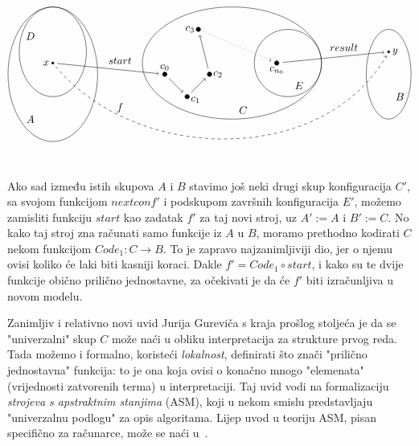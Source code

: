 \begin{equation}\label{dia:alg}
\begin{tikzpicture}[scale=0.75,baseline=(c0)]
\draw (0,0) ellipse (2 and 3);
\draw (8,0.5) ellipse (4 and 2.5);
\draw (15,0) ellipse (1 and 2);
\draw (0,1) ellipse (1.5 and 2);
\draw (10.5,0.5) circle (1.5);
\draw[fill] (0,0.5) coordinate (x) circle (0.05) node[left]{$x$};
\node at(-1,1.7) {$D$};
\node at(-1,-2) {$A$};
\node at(8.5,-1.6) {$C$};
\node at(11,-0.5) {$E$};
\node at(15.5,-1) {$B$};
\node at(3,0.6) {$start$};
\node at(13,1.2) {$result$};
\node at(3,-1.5) {$f$};
\draw[fill] (5,0) coordinate (c0) circle (0.1) node[above]{$c_0$};
\draw[fill] (6,-1) coordinate (c1) circle (0.1) node[right,yshift=-3]{$c_1$};
\draw[fill] (7,0) coordinate (c2) circle (0.1) node[right]{$c_2$};
\draw[fill] (6.5,2) coordinate (c3) circle (0.1) node[left]{$c_3$};
\draw[fill] (10,0.5) coordinate (cn0) circle (0.1) node[below]{$c_{n_0}$};
\draw[fill] (15,1) coordinate (y) circle (0.05) node[right]{$y$};
\draw[shorten <=1.5mm,shorten >=2mm,->] (x) -- (c0);
\draw[shorten <=2mm,shorten >=2mm,->] (c0) -- (c1);
\draw[shorten <=2mm,shorten >=2mm,->] (c1) -- (c2);
\draw[shorten <=2mm,shorten >=2mm,->] (c2) -- (c3);
\draw[dotted,shorten <=2mm,shorten >=2mm,->] (c3) -- (cn0);
\draw[shorten <=2mm,shorten >=1.5mm,->] (cn0) -- (y);
\draw[shorten <=1.5mm, shorten >=1.5mm,dashed,->] (x) to[in=240,out=-50] (y);
\end{tikzpicture}    
\end{equation}


Ako sad između istih skupova $A$ i $B$ stavimo još neki drugi skup konfiguracija $C'$, sa svojom funkcijom $nextconf'$ i podskupom završnih konfiguracija $E'$, možemo zamisliti funkciju $start$ kao zadatak $f'$ za taj novi stroj, uz $A\!':=A$ i $B':=C$. No kako taj stroj zna računati samo funkcije iz $A$ u $B$, moramo prethodno kodirati $C$ nekom funkcijom $Code_1:C\to B$. To je zapravo najzanimljiviji dio, jer o njemu ovisi koliko će laki biti kasniji koraci. Dakle $f'=Code_1\circ start$, i kako su te dvije funkcije obično prilično jednostavne, za očekivati je da će $f'$ biti izračunljiva u novom modelu.

\begin{napomena}[{name=[strojevi s apstraktnim stanjima]}]\label{nap:ASM}
Zanimljiv i relativno novi uvid Jurija Gureviča s kraja prošlog stoljeća je da se "univerzalni" skup $C$ može naći u obliku interpretacija za strukture prvog reda. Tada možemo i formalno, koristeći \emph{lokalnost}, definirati što znači "prilično jednostavna" funkcija: to je ona koja ovisi o konačno mnogo "elemenata" (vrijednosti zatvorenih terma) u interpretaciji. Taj uvid vodi na formalizaciju \emph{strojeva s apstraktnim stanjima} (ASM), koji u nekom smislu predstavljaju "univerzalnu podlogu" za opis algoritama. Lijep uvod u teoriju ASM, pisan specifično za računarce, može se naći u~\cite{huggins}.
\end{napomena}

